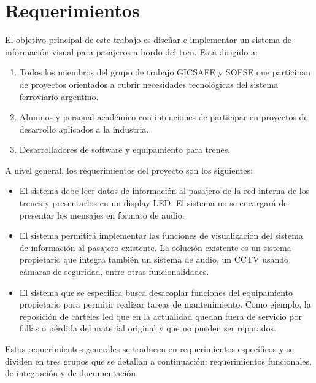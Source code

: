 \section{Requerimientos}

 El objetivo principal de este trabajo es diseñar e implementar un sistema de información visual para pasajeros a bordo del tren. Está dirigido a:
\begin{enumerate}
\item Todos los  miembros del grupo de trabajo GICSAFE y SOFSE que participan de proyectos orientados a cubrir necesidades tecnológicas del sistema ferroviario argentino.
\item Alumnos y personal académico con intenciones de participar en proyectos de desarrollo aplicados a la industria.
\item Desarrolladores de software y equipamiento para trenes.
\end{enumerate}

A nivel general, los requerimientos del proyecto son los siguientes:

\begin{itemize}

\item El sistema debe leer datos de información al pasajero de la red interna de los trenes y presentarlos en un display LED. El sistema no se encargará de presentar los mensajes en formato de audio.

\item El sistema permitirá implementar las funciones de visualización del sistema de información al pasajero existente. La solución existente es un sistema propietario que integra también un sistema de audio, un CCTV usando cámaras de seguridad, entre otras funcionalidades. 

\item El sistema que se especifica busca desacoplar funciones del equipamiento propietario para permitir realizar tareas de mantenimiento. Como ejemplo, la reposición de carteles led que en la actualidad quedan fuera de servicio por fallas o pérdida del material original y que no pueden ser reparados. 

\end{itemize}

Estos requerimientos generales se traducen en requerimientos específicos y se dividen en tres grupos que se detallan a continuación: requerimientos funcionales, de integración y de documentación. 

